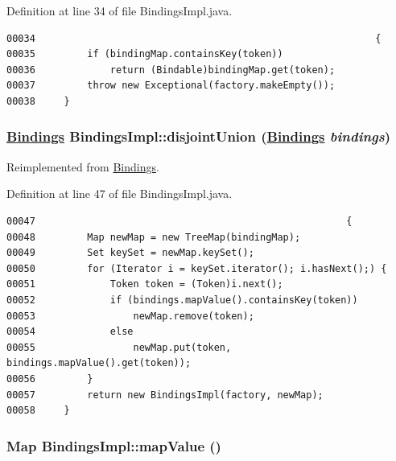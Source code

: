 Definition at line 34 of file Bindings\-Impl.java.\footnotesize\begin{verbatim}00034                                                           {
00035         if (bindingMap.containsKey(token))
00036             return (Bindable)bindingMap.get(token);
00037         throw new Exceptional(factory.makeEmpty());
00038     }
\end{verbatim}\normalsize 
\hypertarget{classBindingsImpl_a4}{
\subsubsection[disjointUnion]{\setlength{\rightskip}{0pt plus 5cm}\hyperlink{interfaceBindings}{Bindings} Bindings\-Impl::disjoint\-Union (\hyperlink{interfaceBindings}{Bindings} {\em bindings})}}
\label{classBindingsImpl_a4}




Reimplemented from \hyperlink{interfaceBindings_a4}{Bindings}.

Definition at line 47 of file Bindings\-Impl.java.\footnotesize\begin{verbatim}00047                                                      {
00048         Map newMap = new TreeMap(bindingMap);
00049         Set keySet = newMap.keySet();
00050         for (Iterator i = keySet.iterator(); i.hasNext();) {
00051             Token token = (Token)i.next();
00052             if (bindings.mapValue().containsKey(token))
00053                 newMap.remove(token);
00054             else
00055                 newMap.put(token, bindings.mapValue().get(token));
00056         }
00057         return new BindingsImpl(factory, newMap);
00058     }
\end{verbatim}\normalsize 
\hypertarget{classBindingsImpl_a0}{
\subsubsection[mapValue]{\setlength{\rightskip}{0pt plus 5cm}Map Bindings\-Impl::map\-Value ()}}
\label{classBindingsImpl_a0}




